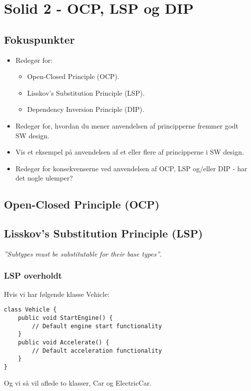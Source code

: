 \section{Solid 2 - OCP, LSP og DIP}

\subsection{Fokuspunkter}

\begin{itemize}
	\item Redegør for:
	\begin{itemize}
		\item Open-Closed Principle (OCP).
		\item Lisskov's Substitution Principle (LSP).
		\item Dependency Inversion Principle (DIP).
	\end{itemize}
	\item Redegør for, hvordan du mener anvendelsen af principperne fremmer godt SW design.
	\item Vis et eksempel på anvendelsen af et eller flere af principperne i SW design.
	\item Redegør for konsekvenserne ved anvendelsen af OCP, LSP og/eller DIP - har det nogle ulemper?
\end{itemize}

\subsection{Open-Closed Principle (OCP)}

\subsection{Lisskov's Substitution Principle (LSP)}
\textit{''Subtypes must be substitutable for their base types''}.

\subsubsection{LSP overholdt}
Hvis vi har følgende klasse Vehicle:

\begin{lstlisting}
class Vehicle {
	public void StartEngine() {
		// Default engine start functionality
	}
	public void Accelerate() {
		// Default acceleration functionality
	}
}
\end{lstlisting}

Og vi så vil aflede to klasser, Car og ElectricCar.

